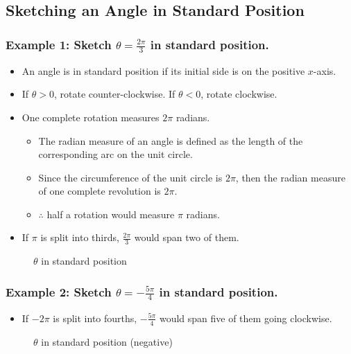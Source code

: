 \documentclass{article}
\begin{document}
\begin{paracol}{2}
\subsection{Sketching an Angle in Standard Position}
\subsubsection{Example 1: Sketch $\theta = \frac{2\pi}{3}$ in standard position.}
\begin{itemize}
  \item An angle is in standard position if its initial side is on the positive $x$-axis.
  \item If $\theta>0$, rotate counter-clockwise. If $\theta<0$, rotate clockwise.
  \item One complete rotation measures $2\pi$ radians.
  \begin{itemize}
    \item The radian measure of an angle is defined as the length of the corresponding arc on the unit circle.
    \item Since the circumference of the unit circle is $2\pi$, then the radian measure of one complete revolution is $2\pi$.
    \item $\therefore$ half a rotation would measure $\pi$ radians.
  \end{itemize}
  \item If $\pi$ is split into thirds, $\frac{2\pi}{3}$ would span two of them.
\end{itemize}
\switchcolumn
\begin{figure}[H]
  \centering
  
  \caption{$\theta$ in standard position}
\end{figure}\switchcolumn*
\subsubsection{Example 2: Sketch $\theta = -\frac{5\pi}{4}$ in standard position.}
\begin{itemize}
  \item If $-2\pi$ is split into fourths, $-\frac{5\pi}{4}$ would span five of them going clockwise.
\end{itemize}
\switchcolumn
\begin{figure}[H]
  \centering
  
  \caption{$\theta$ in standard position (negative)}
\end{figure}






\end{paracol}
\end{document}
